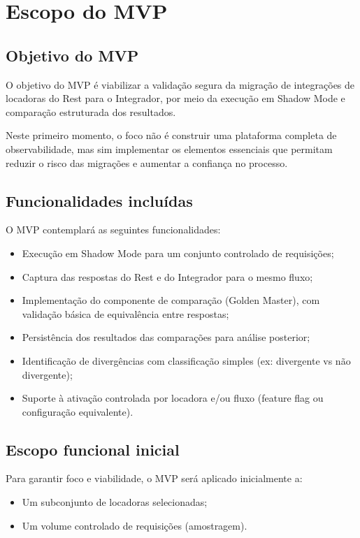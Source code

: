 \section{Escopo do MVP}

\subsection{Objetivo do MVP}
O objetivo do MVP é viabilizar a validação segura da migração de integrações de locadoras do Rest para o Integrador, por meio da execução em Shadow Mode e comparação estruturada dos resultados.

Neste primeiro momento, o foco não é construir uma plataforma completa de observabilidade, mas sim implementar os elementos essenciais que permitam reduzir o risco das migrações e aumentar a confiança no processo.

\subsection{Funcionalidades incluídas}
O MVP contemplará as seguintes funcionalidades:
\begin{itemize}
    \item Execução em Shadow Mode para um conjunto controlado de requisições;
    \item Captura das respostas do Rest e do Integrador para o mesmo fluxo;
    \item Implementação do componente de comparação (Golden Master), com validação básica de equivalência entre respostas;
    \item Persistência dos resultados das comparações para análise posterior;
    \item Identificação de divergências com classificação simples (ex: divergente vs não divergente);
    \item Suporte à ativação controlada por locadora e/ou fluxo (feature flag ou configuração equivalente).
\end{itemize}

\subsection{Escopo funcional inicial}

Para garantir foco e viabilidade, o MVP será aplicado inicialmente a:
\begin{itemize}
    \item Um subconjunto de locadoras selecionadas;
    \item Um volume controlado de requisições (amostragem).
\end{itemize}


